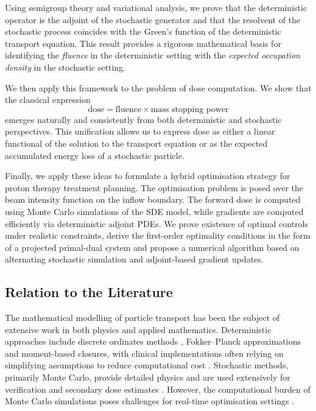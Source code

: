 \documentclass{amsart}
\theoremstyle{plain}
\begin{document}
Using semigroup theory and variational analysis, we prove that the
deterministic operator is the adjoint of the stochastic generator and
that the resolvent of the stochastic process coincides with the
Green’s function of the deterministic transport equation. This result
provides a rigorous mathematical basis for identifying the
\emph{fluence} in the deterministic setting with the \emph{expected
occupation density} in the stochastic setting.

We then apply this framework to the problem of dose computation. We
show that the classical expression
\begin{equation*}
  \text{dose} = \text{fluence} \times \text{mass stopping power}
\end{equation*}
emerges naturally and consistently from both deterministic and
stochastic perspectives. This unification allows us to express dose as
either a linear functional of the solution to the transport equation
or as the expected accumulated energy loss of a stochastic particle.

Finally, we apply these ideas to formulate a hybrid optimisation
strategy for proton therapy treatment planning. The optimisation
problem is posed over the beam intensity function on the inflow
boundary. The forward dose is computed using Monte Carlo simulations
of the SDE model, while gradients are computed efficiently via
deterministic adjoint PDEs. We prove existence of optimal controls
under realistic constraints, derive the first-order optimality
conditions in the form of a projected primal-dual system and propose a
numerical algorithm based on alternating stochastic simulation and
adjoint-based gradient updates.

\subsection{Relation to the Literature}

The mathematical modelling of particle transport has been the subject
of extensive work in both physics and applied
mathematics. Deterministic approaches include discrete ordinates
methods \cite{calloo2025cycle}, Fokker--Planck approximations and
moment-based closures, with clinical implementations often relying on
simplifying assumptions to reduce computational cost
\cite{wagner2011review,roos2008robust}. Stochastic methods, primarily
Monte Carlo, provide detailed physics and are used extensively for
verification and secondary dose estimates
\cite{haghighat2020monte,lux2018monte}. However, the computational
burden of Monte Carlo simulations poses challenges for real-time
optimisation settings
\cite{unkelbach2018robust,fredriksson2012characterization}.
\end{document}
